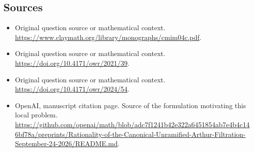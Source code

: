 \documentclass[11pt]{article}
\begin{document}
\subsection{Sources}
\begin{itemize}
\item[S1] Original question source or mathematical context.
\url{https://www.claymath.org/library/monographs/cmim04c.pdf}.
\item[S2] Original question source or mathematical context.
\url{https://doi.org/10.4171/owr/2021/39}.
\item[S3] Original question source or mathematical context.
\url{https://doi.org/10.4171/owr/2024/54}.
\item[S4] OpenAI, manuscript citation page. Source of the formulation motivating this local problem.
\url{https://github.com/openai/math/blob/adc7f1241b42e322a6451854ab7e4b4c146bf78a/preprints/Rationality-of-the-Canonical-Unramified-Arthur-Filtration-September-24-2026/README.md}.
\end{itemize}
\end{document}
